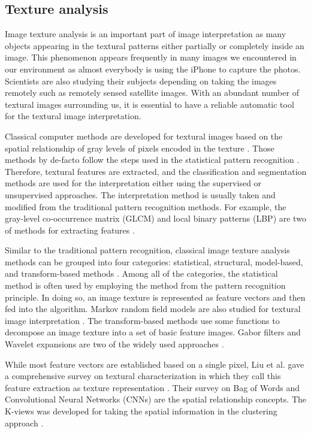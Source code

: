 \documentclass{aci}
\numberwithin{equation}{section}
\begin{document}
\subsection{Texture analysis}

Image texture analysis is an important part of image interpretation as many
objects appearing in the textural patterns either partially or completely inside
an image. This phenomenon appears frequently in many images we encountered in
our environment as almost everybody is using the iPhone to capture the photos.
Scientists are also studying their subjects depending on taking the images
remotely such as remotely sensed satellite images. With an abundant number of
textural images surrounding us, it is essential to have a reliable automatic
tool for the textural image interpretation.

Classical computer methods are developed for textural images based on the
spatial relationship of gray levels of pixels encoded in the texture
\cite{haralick_image_1985,hung_image_2019}. Those methods by de-facto follow the
steps used in the statistical pattern recognition
\cite{fukunaga_introduction_2013}. Therefore, textural features are extracted,
and the classification and segmentation methods are used for the interpretation
either using the supervised or unsupervised approaches. The interpretation
method is usually taken and modified from the traditional pattern recognition
methods. For example, the gray-level co-occurrence matrix (GLCM) and local
binary patterns (LBP) are two of methods for extracting features
\cite{haralick_textural_1973, goos_gray_2000}.

Similar to the traditional pattern recognition, classical image texture analysis
methods can be grouped into four categories: statistical, structural,
model-based, and transform-based methods \cite{bharati_image_2004}. Among all of
the categories, the statistical method is often used by employing the method
from the pattern recognition principle.  In doing so, an image texture is
represented as feature vectors and then fed into the algorithm. Markov random
field models are also studied for textural image interpretation
\cite{hassner_use_1981, cross_markov_1983}. The transform-based methods use some functions to
decompose an image texture into a set of basic feature images. Gabor filters and
Wavelet expansions are two of the widely used approaches
\cite{bovik_multichannel_1990}.

While most feature vectors are established based on a single pixel, Liu et al.
gave a comprehensive survey on textural characterization in which they call this
feature extraction as texture representation \cite{liu_bow_2019}. Their survey
on Bag of Words and Convolutional Neural Networks (CNNs)
\cite{krizhevsky_imagenet_2017} are the spatial relationship concepts. The
K-views was developed for taking the spatial information in the clustering
approach \cite{hung_image_2019}.
\end{document}
